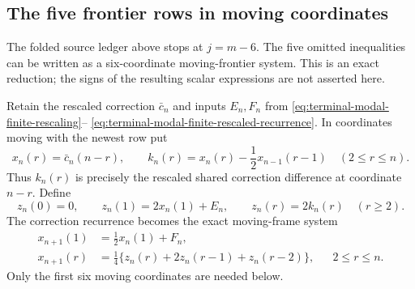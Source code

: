 \subsection{The five frontier rows in moving coordinates}
\label{sec:terminal-modal-static-frontier-reduction}

The folded source ledger above stops at $j=m-6$.  The five omitted
inequalities can be written as a six-coordinate moving-frontier system.  This
is an exact reduction; the signs of the resulting scalar expressions are not
asserted here.

Retain the rescaled correction $\bar c_n$ and inputs $E_n,F_n$ from
\eqref{eq:terminal-modal-finite-rescaling}--
\eqref{eq:terminal-modal-finite-rescaled-recurrence}.  In coordinates moving
with the newest row put
\begin{equation}
 x_n(r)=\bar c_n(n-r),\qquad
 k_n(r)=x_n(r)-\frac12x_{n-1}(r-1)\quad(2\le r\le n).
 \label{eq:terminal-modal-static-frontier-xk}
\end{equation}
Thus $k_n(r)$ is precisely the rescaled shared correction difference at
coordinate $n-r$.  Define
\begin{equation}
 z_n(0)=0,\qquad z_n(1)=2x_n(1)+E_n,\qquad
 z_n(r)=2k_n(r)\quad(r\ge2).
 \label{eq:terminal-modal-static-frontier-z}
\end{equation}
The correction recurrence becomes the exact moving-frame system
\begin{align}
 x_{n+1}(1)&=\frac12x_n(1)+F_n,
 \label{eq:terminal-modal-static-frontier-new}\\
 x_{n+1}(r)&=\frac14\{z_n(r)+2z_n(r-1)+z_n(r-2)\},
 &&2\le r\le n.
 \label{eq:terminal-modal-static-frontier-old}
\end{align}
Only the first six moving coordinates are needed below.

